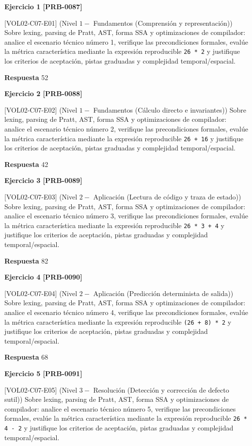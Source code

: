 \documentclass{book}
\begin{document}
\noindent\textbf{Ejercicio 1 [PRB-0087]}

[VOL02-C07-E01] (Nivel \(1 -\) Fundamentos (Comprensión y representación)) Sobre lexing, parsing de Pratt, AST, forma SSA y optimizaciones de compilador: analice el escenario técnico número 1, verifique las precondiciones formales, evalúe la métrica característica mediante la expresión reproducible \texttt{26 * 2} y justifique los criterios de aceptación, pistas graduadas y complejidad temporal/espacial.

\noindent\textbf{Respuesta} 52

\noindent\textbf{Ejercicio 2 [PRB-0088]}

[VOL02-C07-E02] (Nivel \(1 -\) Fundamentos (Cálculo directo e invariantes)) Sobre lexing, parsing de Pratt, AST, forma SSA y optimizaciones de compilador: analice el escenario técnico número 2, verifique las precondiciones formales, evalúe la métrica característica mediante la expresión reproducible \texttt{26 + 16} y justifique los criterios de aceptación, pistas graduadas y complejidad temporal/espacial.

\noindent\textbf{Respuesta} 42

\noindent\textbf{Ejercicio 3 [PRB-0089]}

[VOL02-C07-E03] (Nivel \(2 -\) Aplicación (Lectura de código y traza de estado)) Sobre lexing, parsing de Pratt, AST, forma SSA y optimizaciones de compilador: analice el escenario técnico número 3, verifique las precondiciones formales, evalúe la métrica característica mediante la expresión reproducible \texttt{26 * 3 + 4} y justifique los criterios de aceptación, pistas graduadas y complejidad temporal/espacial.

\noindent\textbf{Respuesta} 82

\noindent\textbf{Ejercicio 4 [PRB-0090]}

[VOL02-C07-E04] (Nivel \(2 -\) Aplicación (Predicción determinista de salida)) Sobre lexing, parsing de Pratt, AST, forma SSA y optimizaciones de compilador: analice el escenario técnico número 4, verifique las precondiciones formales, evalúe la métrica característica mediante la expresión reproducible \texttt{(26 + 8) * 2} y justifique los criterios de aceptación, pistas graduadas y complejidad temporal/espacial.

\noindent\textbf{Respuesta} 68

\noindent\textbf{Ejercicio 5 [PRB-0091]}

[VOL02-C07-E05] (Nivel \(3 -\) Resolución (Detección y corrección de defecto sutil)) Sobre lexing, parsing de Pratt, AST, forma SSA y optimizaciones de compilador: analice el escenario técnico número 5, verifique las precondiciones formales, evalúe la métrica característica mediante la expresión reproducible \texttt{26 * 4 - 2} y justifique los criterios de aceptación, pistas graduadas y complejidad temporal/espacial.
\end{document}

